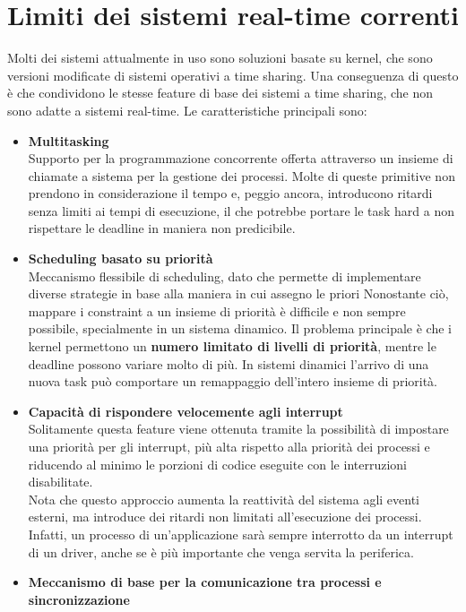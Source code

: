 \documentclass[12pt,openany,onesided]{book}
\begin{document}
\section{Limiti dei sistemi real-time correnti}
Molti dei sistemi attualmente in uso sono soluzioni basate su kernel, che sono versioni modificate di sistemi operativi a time sharing.
Una conseguenza di questo è che condividono le stesse feature di base dei sistemi a time sharing, che non sono adatte a sistemi real-time.
Le caratteristiche principali sono:
\begin{itemize}
\item \textbf{Multitasking}\\
    Supporto per la programmazione concorrente offerta attraverso un insieme di chiamate a sistema per la gestione dei processi. Molte di queste primitive
    non prendono in considerazione il tempo e, peggio ancora, introducono ritardi senza limiti ai tempi di esecuzione, il che potrebbe portare le task hard a non rispettare le deadline in maniera non predicibile.
\item \textbf{Scheduling basato su priorità}\\
    Meccanismo flessibile di scheduling, dato che permette di implementare diverse strategie in base alla maniera in cui assegno le priori
    Nonostante ciò, mappare i constraint a un insieme di priorità è difficile e non sempre possibile, specialmente in un sistema dinamico.
    Il problema principale è che i kernel permettono un \textbf{numero limitato di livelli di priorità}, mentre le deadline possono variare molto di più.
    In sistemi dinamici l'arrivo di una nuova task può comportare un remappaggio dell'intero insieme di priorità.
\item \textbf{Capacità di rispondere velocemente agli interrupt}\\
    Solitamente questa feature viene ottenuta tramite la possibilità di impostare una priorità per gli interrupt, più alta rispetto alla priorità dei processi e 
    riducendo al minimo le porzioni di codice eseguite con le interruzioni disabilitate.
    \\
    Nota che questo approccio aumenta la reattività del sistema agli eventi esterni, ma introduce dei ritardi non limitati all'esecuzione dei processi.
    Infatti, un processo di un'applicazione sarà sempre interrotto da un interrupt di un driver, anche se è più importante che venga servita la periferica.
\item \textbf{Meccanismo di base per la comunicazione tra processi e sincronizzazione}\\

\end{itemize}
\end{document}
